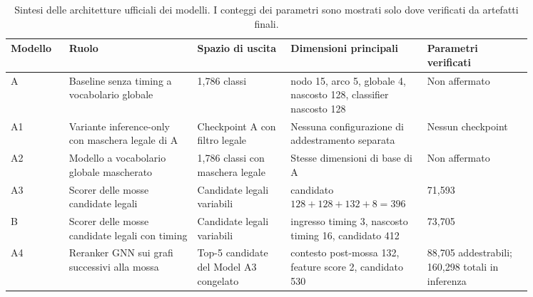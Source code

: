 \begin{table}[H]
\centering
\scriptsize
\caption{Sintesi delle architetture ufficiali dei modelli.  I conteggi dei parametri sono mostrati solo dove verificati da artefatti finali.}
\label{tab:model-architecture-summary}
\begin{tabular}{p{0.10\linewidth}p{0.22\linewidth}p{0.16\linewidth}p{0.19\linewidth}p{0.18\linewidth}}
\toprule
Modello & Ruolo & Spazio di uscita & Dimensioni principali & Parametri verificati \\
\midrule
A & Baseline senza timing a vocabolario globale & 1,786 classi & nodo 15, arco 5, globale 4, nascosto 128, classifier nascosto 128 & Non affermato \\
A1 & Variante inference-only con maschera legale di A & Checkpoint A con filtro legale & Nessuna configurazione di addestramento separata & Nessun checkpoint \\
A2 & Modello a vocabolario globale mascherato & 1,786 classi con maschera legale & Stesse dimensioni di base di A & Non affermato \\
A3 & Scorer delle mosse candidate legali & Candidate legali variabili & candidato \(128+128+132+8=396\) & 71,593 \\
B & Scorer delle mosse candidate legali con timing & Candidate legali variabili & ingresso timing 3, nascosto timing 16, candidato 412 & 73,705 \\
A4 & Reranker GNN sui grafi successivi alla mossa & Top-5 candidate del Model A3 congelato & contesto post-mossa 132, feature score 2, candidato 530 & 88,705 addestrabili; 160,298 totali in inferenza \\
\bottomrule
\end{tabular}
\end{table}
